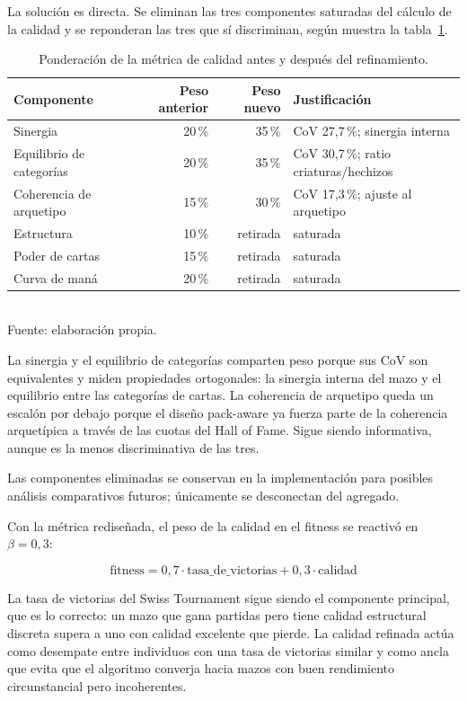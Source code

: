 La solución es directa. Se eliminan las tres componentes saturadas del cálculo de la calidad y se reponderan las tres que sí discriminan, según muestra la tabla~\ref{tab:quality-pesos}.

\begin{table}[H]
\centering
\caption{Ponderación de la métrica de calidad antes y después del refinamiento.}
\label{tab:quality-pesos}
\begin{tabular}{lrrl}
\toprule
\textbf{Componente} & \textbf{Peso anterior} & \textbf{Peso nuevo} & \textbf{Justificación} \\
\midrule
Sinergia                  & 20\,\% & 35\,\% & CoV 27,7\,\%; sinergia interna \\
Equilibrio de categorías  & 20\,\% & 35\,\% & CoV 30,7\,\%; ratio criaturas/hechizos \\
Coherencia de arquetipo   & 15\,\% & 30\,\% & CoV 17,3\,\%; ajuste al arquetipo \\
\midrule
Estructura                & 10\,\% & retirada & saturada \\
Poder de cartas           & 15\,\% & retirada & saturada \\
Curva de maná             & 20\,\% & retirada & saturada \\
\bottomrule
\end{tabular}
\\[2pt]{\footnotesize Fuente: elaboración propia.}
\end{table}

La sinergia y el equilibrio de categorías comparten peso porque sus CoV son equivalentes y miden propiedades ortogonales: la sinergia interna del mazo y el equilibrio entre las categorías de cartas. La coherencia de arquetipo queda un escalón por debajo porque el diseño pack-aware ya fuerza parte de la coherencia arquetípica a través de las cuotas del Hall of Fame. Sigue siendo informativa, aunque es la menos discriminativa de las tres.

Las componentes eliminadas se conservan en la implementación para posibles análisis comparativos futuros; únicamente se desconectan del agregado.

Con la métrica rediseñada, el peso de la calidad en el fitness se reactivó en $\beta = 0{,}3$:

$$\text{fitness} = 0{,}7 \cdot \text{tasa\_de\_victorias} + 0{,}3 \cdot \text{calidad}$$

La tasa de victorias del Swiss Tournament sigue siendo el componente principal, que es lo correcto: un mazo que gana partidas pero tiene calidad estructural discreta supera a uno con calidad excelente que pierde. La calidad refinada actúa como desempate entre individuos con una tasa de victorias similar y como ancla que evita que el algoritmo converja hacia mazos con buen rendimiento circunstancial pero incoherentes.

